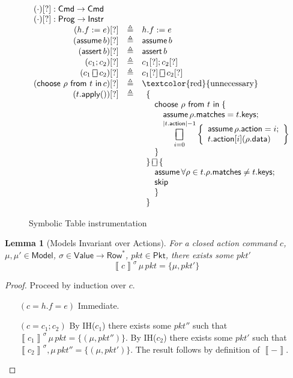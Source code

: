 \documentclass{article}
\newcommand{\pkt}{\mathit{pkt}}
\newcommand{\denote}[1]{\left\llbracket#1\right\rrbracket}
\newcommand{\Value}{\mathsf{Value}}
\newcommand{\Cmd}{\mathsf{Cmd}}
\newcommand{\Instr}{\mathsf{Instr}}
\newcommand{\Prog}{\mathsf{Prog}}
\newcommand{\Pkt}{\mathsf{Pkt}}
\newcommand{\Model}{\mathsf{Model}}
\newcommand{\Row}{\mathsf{Row}}
\newcommand{\matches}{\mathsf{matches}}
\newcommand{\action}{\mathsf{action}}
\newcommand{\keys}{\mathsf{keys}}
\newcommand{\data}{\mathsf{data}}
\newcommand{\assert}{\mathop{\mathsf{assert}}}
\newcommand{\assume}{\mathop{\mathsf{assume}}}
\newcommand{\apply}{\mathsf{apply}}
\newcommand{\choiceop}{\rotatebox[origin=c]{90}{$\sqsubset\!\!\!\sqsupset$}}
\newcommand{\choice}{\mathbin{\choiceop}}
\DeclareMathOperator*{\bigchoice}{\scalerel*{\choiceop}{\sum}}
\renewcommand{\choose}[2]{\mathop{\mathsf{choose}~#1~\mathsf{from}~#2~\mathsf{in}}}
\newcommand{\SKIP}{\mathsf{skip}}
\newtheorem{lemma}{Lemma}
\begin{document}
\begin{figure}[htp]
  \[\begin{array}{r >{\triangleq}cl}
  \multicolumn{3}{l}{(\cdot)[?] : \Cmd \to \Cmd} \\
  \multicolumn{3}{l}{(\cdot)[?] : \Prog \to \Instr} \\
  (h.f := e)[?] && h.f := e \\
  (\assume b)[?] && \assume b \\
  (\assert b)[?] && \assert b\\
  (c_1;c_2)[?] && c_1[?];c_2[?]\\
  (c_1 \choice c_2)[?] && c_1[?] \choice c_2[?]\\
  (\choose \rho t c)[?] &&
  \textrm{\textcolor{red}{unnecessary}} \\
  (t.\apply())[?] &&
  \begin{array}[t]{l} \displaystyle
    \{ \\
    \quad \choose \rho t \;\{ \\
    \qquad \assume \rho.\matches = t.\keys; \\
    \qquad \displaystyle \bigchoice_{i=0}^{|t.\action| -1}
    \left\{\begin{array}{l}
    \assume \rho.\action = i;\\
    t.\action[i](\rho.\data)
    \end{array}\right\}\\
    \quad \} \\
    \} \choice \{ \\
    \quad \assume \forall \rho \in t. \rho.\matches \neq t.\keys; \\
    \quad \SKIP \\
    \quad \}\\
    \}
  \end{array}
  \end{array}
  \]
  \caption{Symbolic Table instrumentation}
  \label{fig:table-instrument}
\end{figure}


\begin{lemma}[Models Invariant over Actions]
  \label{lem:models-invariant-over-actions}
  For a closed action command $c$, $\mu,\mu'
  \in \Model$, $\sigma \in \Value \to
  \Row^*$, $\pkt \in \Pkt$, there exists some $\pkt'$
  \[\denote{c}^\sigma\,\mu\,\pkt = \{\mu,\pkt'\}\]
  \end{lemma}

\begin{proof}
  Proceed by induction over $c$.
  \begin{enumerate}[align=left]
  \item[$(c = h.f = e)$] Immediate.
  \item[$(c = c_1;c_2)$]
    By IH($c_1$) there exists some $\pkt''$ such that
    $\denote{c_1}^\sigma\,\mu\,\pkt = \{(\mu,\pkt'')\}$.
    By IH($c_2$) there exists some $\pkt'$ such that
    $\denote{c_2}^\sigma,\mu\,pkt'' = \{(\mu, \pkt')\}$.
    The result follows by definition of $\denote{-}$.
    \end{enumerate}
\end{proof}
\end{document}
